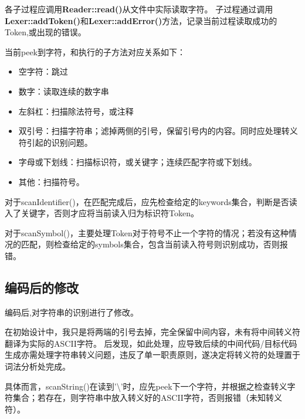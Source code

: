 各子过程应调用\textbf{Reader::read()}从文件中实际读取字符。
子过程通过调用\textbf{Lexer::addToken()}和\textbf{Lexer::addError()}方法，记录当前过程读取成功的Token,或出现的错误。

当前peek到字符，和执行的子方法对应关系如下：
\begin{itemize}
    \item 空字符：跳过
    \item 数字：读取连续的数字串
    \item 左斜杠：扫描除法符号，或注释
    \item 双引号：扫描字符串；滤掉两侧的引号，保留引号内的内容。同时应处理转义符引起的识别问题。
    \item 字母或下划线：扫描标识符，或关键字；连续匹配字符或下划线。
    \item 其他：扫描符号。
\end{itemize}

对于scanIdentifier()，在匹配完成后，应先检查给定的keywords集合，判断是否读入了关键字，否则才应将当前读入归为标识符Token。

对于scanSymbol()，主要处理Token对于符号不止一个字符的情况；若没有这种情况的匹配，则检查给定的symbols集合，包含当前读入符号则识别成功，否则报错。

\subsection{编码后的修改}

编码后,对字符串的识别进行了修改。

在初始设计中，我只是将两端的引号去掉，完全保留中间内容，未有将中间转义符翻译为实际的ASCII字符。
后发现，如此处理，应导致后续的中间代码/目标代码生成亦需处理字符串转义问题，违反了单一职责原则，遂决定将转义符的处理置于词法分析处完成。

具体而言，scanString()在读到'\textbackslash'时，应先peek下一个字符，并根据之检查转义字符集合；若存在，则字符串中放入转义好的ASCII字符，否则报错（未知转义符）。